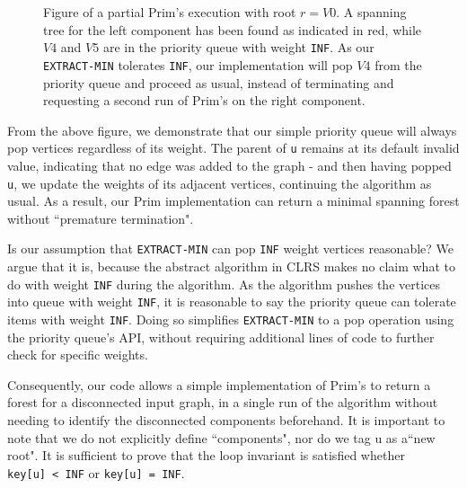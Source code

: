 \begin{figure}[H]
\caption{Figure of a partial Prim's execution with root $r = V0$. A spanning tree for the left component has been found as indicated in red, while $V4$ and $V5$ are in the priority queue with weight \texttt{INF}. As our \texttt{EXTRACT-MIN} tolerates \texttt{INF}, our implementation will pop $V4$ from the priority queue and proceed as usual, instead of terminating and requesting a second run of Prim's on the right component.}
\end{figure}

From the above figure, we demonstrate that our simple priority queue will always pop vertices regardless of its weight. The parent of \texttt{u} remains at its default invalid value, indicating that no edge was added to the graph - and then having popped \texttt{u}, we update the weights of its adjacent vertices, continuing the algorithm as usual. As a result, our Prim implementation can return a minimal spanning forest without ``premature termination".

Is our assumption that \texttt{EXTRACT-MIN} can pop \texttt{INF} weight vertices reasonable? We argue that it is, because the abstract algorithm in CLRS makes no claim what to do with weight \texttt{INF} during the algorithm. As the algorithm pushes the vertices into queue with weight \texttt{INF}, it is reasonable to say the priority queue can tolerate items with weight \texttt{INF}. Doing so simplifies \texttt{EXTRACT-MIN} to a pop operation using the priority queue's API, without requiring additional lines of code to further check for specific weights.

Consequently, our code allows a simple implementation of Prim's to return a forest for a disconnected input graph, in a single run of the algorithm without needing to identify the disconnected components beforehand. It is important to note that we do not explicitly define ``components", nor do we tag u as a``new root". It is sufficient to prove that the loop invariant is satisfied whether \texttt{key[u]~< INF} or \texttt{key[u] = INF}.

